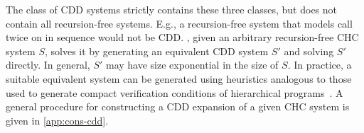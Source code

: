 The class of CDD systems strictly contains these three classes, 
but does not contain all
recursion-free systems.
%
E.g., a recursion-free system that models  
call  twice on  in sequence would not
be CDD.
%
\sys, given an arbitrary recursion-free CHC system $S$,
solves it by generating an equivalent CDD system $S'$ and
solving $S'$ directly.
%
In general, $S'$ may have size exponential in the size of
$S$.
%
In practice, a suitable equivalent system can be generated using
heuristics analogous to those used to generate compact verification
conditions of hierarchical programs~\cite{flanagan01,lal-qadeer15}.
%
A general procedure for constructing a CDD expansion of a given CHC
system is given in \autoref{app:cons-cdd}.

